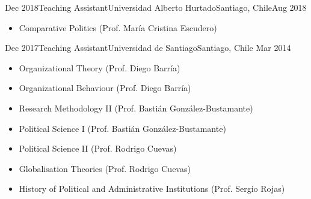 





\begin{experiences}
  \experience
    {Dec 2018}{Teaching Assistant}{Universidad Alberto Hurtado}{Santiago, Chile}{Aug 2018}
    {\begin{itemize}
    \item Comparative Politics {\small (Prof. María Cristina Escudero)}
    \end{itemize}}
    {}
\end{experiences}
\vspace{-2mm}

\begin{experiences}
  \emptySeparator 
  \experience 
    {Dec 2017}{Teaching Assistant}{Universidad de Santiago}{Santiago, Chile} {Mar 2014}
    {\begin{itemize}
    \item Organizational Theory {\small (Prof. Diego Barría)}
    \item Organizational Behaviour {\small (Prof. Diego Barría)}
    \item Research Methodology II {\small (Prof. Bastián González-Bustamante)}
    \item Political Science I {\small (Prof. Bastián González-Bustamante)}
    \item Political Science II {\small (Prof. Rodrigo Cuevas)}
	\item Globalisation Theories {\small (Prof. Rodrigo Cuevas)}
	\item History of Political and Administrative Institutions {\small (Prof. Sergio Rojas)}
    \end{itemize}}
    {}
\end{experiences}
\vspace{-2mm}

